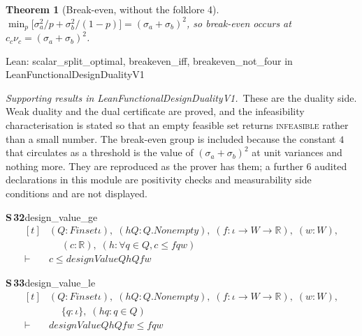 \documentclass[conference]{IEEEtran}
\newtheorem{theorem}{Theorem}
\theoremstyle{definition}
\newcommand{\lean}[1]{\textsf{\footnotesize #1}}
\newcommand{\leanbox}[1]{%
  \par\vspace{2pt}\noindent
  {\footnotesize\textsf{Lean: #1}}\par\vspace{2pt}}
\begin{document}
\begin{theorem}[Break-even, without the folklore 4]
\label{thm:fn-breakeven}
$\min_{p}\bigl[\sigma_{a}^{2}/p+\sigma_{b}^{2}/(1-p)\bigr]=(\sigma_{a}+\sigma_{b})^{2}$, so
break-even occurs at $c_{c}\nu_{c}=(\sigma_{a}+\sigma_{b})^{2}$.
\end{theorem}

\leanbox{\lean{scalar\_split\_optimal}, \lean{breakeven\_iff}, \lean{breakeven\_not\_four}
in \lean{LeanFunctionalDesignDualityV1}}

\noindent\emph{Supporting results in \lean{LeanFunctionalDesignDualityV1}.}~These are the duality side. Weak duality and the dual certificate are proved, and the infeasibility characterisation is stated so that an empty feasible set returns \textsc{infeasible} rather than a small number. The break-even group is included because the constant $4$ that circulates as a threshold is the value of $(\sigma_{a}+\sigma_{b})^{2}$ at unit variances and nothing more. They are reproduced as the prover has them; a further $6$ audited declarations in this module are positivity checks and measurability side conditions and are not displayed.

\noindent\textbf{S\,32}\quad\lean{design\_value\_ge}
{\footnotesize\[ \begin{aligned}[t]
&(\mathit{Q} : \mathit{Finset} \iota ),\; (\mathit{hQ} : \mathit{Q}.\mathit{Nonempty}),\; (\mathit{f} : \iota \to \mathit{W} \to \mathbb{R} ),\; (\mathit{w} : \mathit{W}),\\
&\quad \; (\mathit{c} : \mathbb{R} ),\; (\mathit{h} : \forall \mathit{q} \in \mathit{Q}, \mathit{c} \leq \mathit{f} \mathit{q} \mathit{w})\\
\vdash\;&\mathit{c} \leq \mathit{designValue} \mathit{Q} \mathit{hQ} \mathit{f} \mathit{w}
\end{aligned} \]}

\noindent\textbf{S\,33}\quad\lean{design\_value\_le}
{\footnotesize\[ \begin{aligned}[t]
&(\mathit{Q} : \mathit{Finset} \iota ),\; (\mathit{hQ} : \mathit{Q}.\mathit{Nonempty}),\; (\mathit{f} : \iota \to \mathit{W} \to \mathbb{R} ),\; (\mathit{w} : \mathit{W}),\\
&\quad \; \{ \mathit{q} : \iota \},\; (\mathit{hq} : \mathit{q} \in \mathit{Q})\\
\vdash\;&\mathit{designValue} \mathit{Q} \mathit{hQ} \mathit{f} \mathit{w} \leq \mathit{f} \mathit{q} \mathit{w}
\end{aligned} \]}
\end{document}
